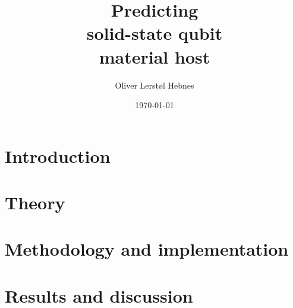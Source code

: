 \documentclass[twoside, english, notitlepage, 12pt]{uiofysmaster}
\author{Oliver Lerstøl Hebnes}
\title{Predicting\\
solid-state qubit\\
material host
}
\date{\today}
\begin{document}
\hypersetup{pageanchor=false}
\frontmatter
    \maketitle



    \setcounter{tocdepth}{2}
    \tableofcontents

\mainmatter
    \part{Introduction}
      

    \part{Theory}
        
        
        

    \part{Methodology and implementation}

        
        

    \part{Results and discussion}

      
      
\end{document}
